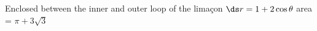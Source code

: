 {Enclosed between the inner and  outer loop of the lima\c con $\ds r=1+2\cos \theta$}
{area = $\pi+3\sqrt{3}$
}
